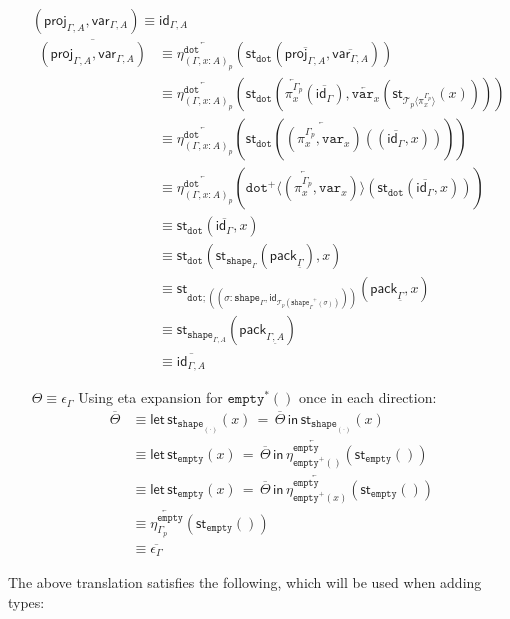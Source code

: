 \documentclass[10pt]{article}
\theoremstyle{definition}
\newcommand{\sigmacl}[3]{\ensuremath{(#1{:}#2,#3)}}
\newcommand{\id}{\mathsf{id}}
\newcommand{\rewrite}[2]{\overleftarrow{#1}(#2)}
\newcommand\St[2]{\ensuremath{{#1}^*(#2)}}
\newcommand\StI[2]{\ensuremath{\mathsf{st}_{#1}(#2)}}
\newcommand\StE[4]{\ensuremath{\mathsf{let} \, \StI{#1}{#3} \, = \, {#2} \, \mathsf{in} \, #4}}
\newcommand\TrPlus[2]{\ensuremath{{#1}^+(#2)}}
\newcommand\El[2]{\mathcal{T}_{#1}(#2)}
\newcommand\ApEl[2]{\mathcal{T}_{#1}\langle#2\rangle}
\newcommand\ApPlus[2]{\ensuremath{{#1}^+ \langle #2 \rangle }}
\newcommand\pack[1]{\ensuremath{\mathsf{pack}_{#1}}}
\newcommand{\modeof}[1]{{#1}_p}
\newcommand{\tdot}{\ensuremath{\mathtt{dot}}}
\newcommand{\tempty}{\ensuremath{\mathtt{empty}}}
\newcommand{\tshape}[1]{\ensuremath{\mathtt{shape}_{#1}}}
\newcommand{\upstairs}[1]{\overline{#1}}
\newcommand{\downstairs}[1]{\underline{#1}}
\newcommand\proj[1]{\ensuremath{\mathsf{proj}_{#1}}}
\newcommand\qvar[1]{\ensuremath{\mathsf{var}_{#1}}}
\newcommand\var[1]{\ensuremath{\mathtt{var}_{#1}}}
\begin{document}
\begin{enumerate}[style = multiline, labelwidth = 80pt]
\item[{$(\proj{\Gamma,A}, \qvar{\Gamma,A}) \equiv \id_{\Gamma, A}$}] 
\begin{align*}
\upstairs{(\proj{\Gamma,A}, \qvar{\Gamma,A})}
&\equiv \rewrite{\eta^\tdot_{\modeof{(\Gamma, x : A)}}}{\StI{\tdot}{\upstairs{\proj{\Gamma,A}}, \upstairs{\qvar{\Gamma,A}}}} \\
&\equiv \rewrite{\eta^\tdot_{\modeof{(\Gamma, x : A)}}}{\StI{\tdot}{\rewrite{\pi^{\modeof{\Gamma}}_x}{\upstairs{\id_\Gamma}}, \rewrite{\var{x}}{\StI{\ApEl{p}{\pi^{\modeof{\Gamma}}_x}}{x}}}} \\
&\equiv \rewrite{\eta^\tdot_{\modeof{(\Gamma, x : A)}}}{\StI{\tdot}{\rewrite{(\pi^{\modeof{\Gamma}}_x, \var{x})}{(\upstairs{\id_\Gamma}, x)}}}\\
&\equiv \rewrite{\eta^\tdot_{\modeof{(\Gamma, x : A)}}}{\rewrite{\ApPlus{\tdot}{(\pi^{\modeof{\Gamma}}_x, \var{x})}}{\StI{\tdot}{\upstairs{\id_\Gamma}, x}}}\\
&\equiv \StI{\tdot}{\upstairs{\id_\Gamma}, x} \\
&\equiv \StI{\tdot}{\StI{\tshape{\Gamma}}{\pack{\downstairs{\Gamma}}}, x}\\
&\equiv \StI{\tdot ; (\sigmacl{\sigma}{\tshape{\Gamma}}{\id_{\El{p}{\TrPlus{\tshape{\Gamma}}{\sigma}}}})}{\pack{\downstairs{\Gamma}}, x} \\
&\equiv \StI{\tshape{\Gamma, A}}{\pack{\downstairs{\Gamma, A}}} \\
&\equiv \upstairs{\id_{\Gamma, A}}
\end{align*}

\item[$\Theta \equiv \epsilon_\Gamma$] 
Using eta expansion for $\St{\tempty}{}$ once in each direction:
\begin{align*}
\upstairs{\Theta}
&\equiv \StE{\tshape{(\cdot)}}{\upstairs{\Theta}}{x}{\StI{\tshape{(\cdot)}}{x}} \\
&\equiv \StE{\tempty}{\upstairs{\Theta}}{x}{\rewrite{\eta^\tempty_{\TrPlus{\tempty}{}}}{\StI{\tempty}{}}} \\
&\equiv \StE{\tempty}{\upstairs{\Theta}}{x}{\rewrite{\eta^\tempty_{\TrPlus{\tempty}{x}}}{\StI{\tempty}{}}} \\
&\equiv \rewrite{\eta^\tempty_{\modeof{\Gamma}}}{\StI{\tempty}{}} \\
&\equiv \upstairs{\epsilon_\Gamma}
\end{align*}
\end{enumerate}

The above translation satisfies the following, which will be used when
adding types:
\end{document}
